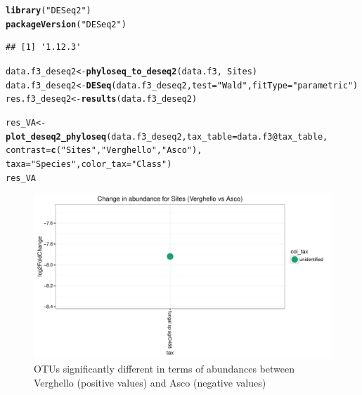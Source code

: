 \documentclass[12pt]{article}\usepackage[]{graphicx}\usepackage[]{color}
\makeatletter
\def\maxwidth{ %
  \ifdim\Gin@nat@width>\linewidth
    \linewidth
  \else
    \Gin@nat@width
  \fi
}
\newcommand{\hlstr}[1]{\textcolor[rgb]{0.192,0.494,0.8}{#1}}%
\newcommand{\hlopt}[1]{\textcolor[rgb]{0,0,0}{#1}}%
\newcommand{\hlstd}[1]{\textcolor[rgb]{0.345,0.345,0.345}{#1}}%
\newcommand{\hlkwb}[1]{\textcolor[rgb]{0.69,0.353,0.396}{#1}}%
\newcommand{\hlkwc}[1]{\textcolor[rgb]{0.333,0.667,0.333}{#1}}%
\newcommand{\hlkwd}[1]{\textcolor[rgb]{0.737,0.353,0.396}{\textbf{#1}}}%
\newenvironment{kframe}{%
 \def\at@end@of@kframe{}%
 \ifinner\ifhmode%
  \def\at@end@of@kframe{\end{minipage}}%
  \begin{minipage}{\columnwidth}%
 \fi\fi%
 \def\FrameCommand##1{\hskip\@totalleftmargin \hskip-\fboxsep
 \colorbox{shadecolor}{##1}\hskip-\fboxsep
     \hskip-\linewidth \hskip-\@totalleftmargin \hskip\columnwidth}%
 \MakeFramed {\advance\hsize-\width
   \@totalleftmargin\z@ \linewidth\hsize
   \@setminipage}}%
 {\par\unskip\endMakeFramed%
 \at@end@of@kframe}
\newenvironment{knitrout}{}{} %
\numberwithin{figure}{section}
\makeatother
\begin{document}
\begin{knitrout}\small
{}\color{fgcolor}\begin{kframe}
\begin{alltt}
\hlkwd{library}\hlstd{(}\hlstr{"DESeq2"}\hlstd{)}
\hlkwd{packageVersion}\hlstd{(}\hlstr{"DESeq2"}\hlstd{)}
\end{alltt}
\begin{verbatim}
## [1] '1.12.3'
\end{verbatim}
\begin{alltt}
\hlstd{data.f3_deseq2} \hlkwb{<-} \hlkwd{phyloseq_to_deseq2}\hlstd{(data.f3,} \hlopt{~} \hlstd{Sites)}
\hlstd{data.f3_deseq2} \hlkwb{<-} \hlkwd{DESeq}\hlstd{(data.f3_deseq2,} \hlkwc{test} \hlstd{=} \hlstr{"Wald"}\hlstd{,} \hlkwc{fitType} \hlstd{=} \hlstr{"parametric"}\hlstd{)}
\hlstd{res.f3_deseq2} \hlkwb{<-} \hlkwd{results}\hlstd{(data.f3_deseq2)}
\end{alltt}
\end{kframe}
\end{knitrout}

\begin{knitrout}\small
{}\color{fgcolor}\begin{kframe}
\begin{alltt}
\hlstd{res_VA} \hlkwb{<-} \hlkwd{plot_deseq2_phyloseq}\hlstd{(data.f3_deseq2,} \hlkwc{tax_table} \hlstd{= data.f3}\hlopt{@}\hlkwc{tax_table}\hlstd{,}
                               \hlkwc{contrast} \hlstd{=} \hlkwd{c}\hlstd{(}\hlstr{"Sites"}\hlstd{,} \hlstr{"Verghello"}\hlstd{,} \hlstr{"Asco"}\hlstd{),}
                               \hlkwc{taxa} \hlstd{=} \hlstr{"Species"}\hlstd{,} \hlkwc{color_tax} \hlstd{=} \hlstr{"Class"}\hlstd{)}
\hlstd{res_VA}
\end{alltt}
\end{kframe}\begin{figure}

{\centering \includegraphics[width=\maxwidth]{figure/unnamed-chunk-69-1} 

}

\caption[OTUs significantly different in terms of abundances between Verghello (positive values) and Asco (negative values)]{OTUs significantly different in terms of abundances between Verghello (positive values) and Asco (negative values)}\label{fig:unnamed-chunk-69}
\end{figure}


\end{knitrout}
\end{document}
